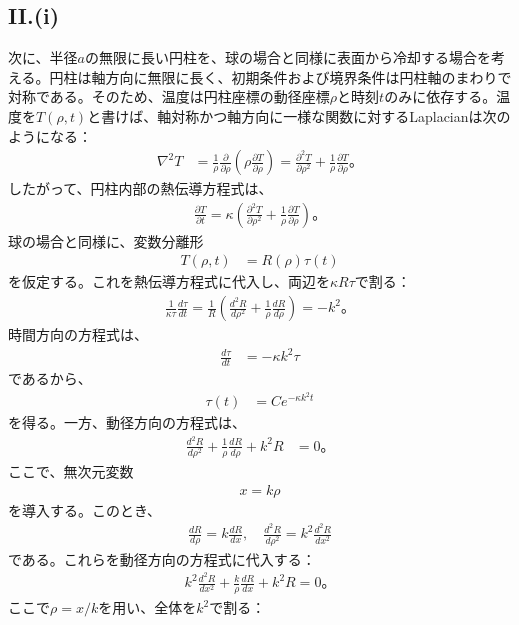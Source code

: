 \documentclass[platex,dvipdfmx,a4paper]{jsarticle}
\newcommand{\hb}[2]{\frac{\partial #1}{\partial #2}}
\newcommand{\bbn}[2]{\frac{d #1}{d #2}}
\newcommand{\nhb}[3]{\frac{\partial^{#1} #2}{\partial #3^{#1}}}
\newcommand{\nbbn}[3]{\frac{d^{#1} #2}{d #3^{#1}}}
\begin{document}
  \subsection*{II.(i)}
  
  次に、半径$a$の無限に長い円柱を、球の場合と同様に表面から冷却する場合を考える。円柱は軸方向に無限に長く、初期条件および境界条件は円柱軸のまわりで対称である。そのため、温度は円柱座標の動径座標$\rho$と時刻$t$のみに依存する。温度を$T(\rho,t)$と書けば、軸対称かつ軸方向に一様な関数に対するLaplacianは次のようになる：
  \begin{align*}
    \nabla^2T
    &=\frac{1}{\rho}\hb{}{\rho}\left(\rho\hb{T}{\rho}\right)=\nhb{2}{T}{\rho}+\frac{1}{\rho}\hb{T}{\rho}。
  \end{align*}
  したがって、円柱内部の熱伝導方程式は、
  \begin{align*}
    \hb{T}{t}=\kappa\left(\nhb{2}{T}{\rho}+\frac{1}{\rho}\hb{T}{\rho}\right)。
  \end{align*}
  球の場合と同様に、変数分離形
  \begin{align*}
    T(\rho,t)&=R(\rho)\tau(t)
  \end{align*}
  を仮定する。これを熱伝導方程式に代入し、両辺を$\kappa R\tau$で割る：
  \begin{align*}
    \frac{1}{\kappa\tau}\bbn{\tau}{t}=\frac{1}{R}\left(\nbbn{2}{R}{\rho}+\frac{1}{\rho}\bbn{R}{\rho}\right)=-k^2。
  \end{align*}
  時間方向の方程式は、
  \begin{align*}
    \bbn{\tau}{t}&=-\kappa k^2\tau
  \end{align*}
  であるから、
  \begin{align*}
    \tau(t)&=C e^{-\kappa k^2t}
  \end{align*}
  を得る。一方、動径方向の方程式は、
  \begin{align*}
    \nbbn{2}{R}{\rho}+\frac{1}{\rho}\bbn{R}{\rho}+k^2R&=0。
  \end{align*}
  ここで、無次元変数
  \begin{align*}
    x=k\rho
  \end{align*}
  を導入する。このとき、
  \begin{align*}
    \bbn{R}{\rho}=k\bbn{R}{x},\quad\nbbn{2}{R}{\rho}=k^2\nbbn{2}{R}{x}
  \end{align*}
  である。これらを動径方向の方程式に代入する：
  \begin{align*}
    k^2\nbbn{2}{R}{x}+\frac{k}{\rho}\bbn{R}{x}+k^2R=0。
  \end{align*}
  ここで$\rho=x/k$を用い、全体を$k^2$で割る：
\end{document}
